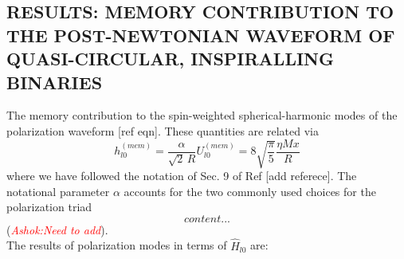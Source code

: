 \documentclass[prd,preprintnumbers,twocolumn,eqsecnum,floatfix,letter]{revtex4}
\newcommand{\ashok}[1]{\textcolor{red}{\textit{Ashok:#1}}}
\begin{document}
\subsection{RESULTS: MEMORY CONTRIBUTION TO THE POST-NEWTONIAN WAVEFORM OF QUASI-CIRCULAR, INSPIRALLING BINARIES}
The memory contribution to the spin-weighted spherical-harmonic modes of the polarization waveform [ref eqn]. These quantities are related via 
\begin{equation}
	h_{l0}^{(mem)} = \frac{\alpha}{\sqrt{2} \, R} U_{l0}^{(mem)} = 8 \sqrt{\frac{\pi}{5}}\frac{\eta M x}{R} 
\end{equation}
where we have followed the notation of Sec. 9 of Ref [add referece]. The notational parameter $\alpha$ accounts for the two commonly used choices for the polarization triad 
\begin{equation}
	content...
\end{equation}
(\ashok{Need to add}).\\
The results of polarization modes in terms of $\hat{H}_{l0}$ are:
\end{document}

